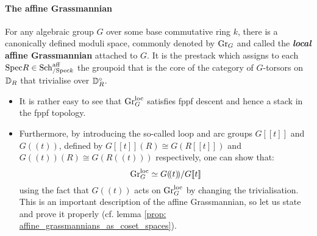                \paragraph{The affine Grassmannian}
                    \begin{definition} \label{def: local_affine_grassmannians}
                        For any algebraic group $G$ over some base commutative ring $k$, there is a canonically defined moduli space, commonly denoted by $\mathrm{Gr}_G$ and called the \textbf{\textit{local} affine Grassmannian} attached to $G$. It is the prestack which assigns to each $\mathrm{Spec} R \in \mathrm{Sch}_{/\mathrm{Spec} k}^{\mathrm{aff}}$ the groupoid that is the core of the category of $G$-torsors on $\mathbb{D}_R$ that trivialise over $\mathbb{D}_R^{\circ}$.  
                    \end{definition}
                    \begin{remark}
                        \noindent
                        \begin{itemize}
                            \item It is rather easy to see that $\mathrm{Gr}_G^{\mathrm{loc}}$ satisfies fppf descent and hence a stack in the fppf topology.
                            \item Furthermore, by introducing the so-called loop and arc groups $G[\![t]\!]$ and $G(\!(t)\!)$, defined by $G[\![t]\!](R) \cong G(R[\![t]\!])$ and $G(\!(t)\!)(R) \cong G(R(\!(t)\!))$ respectively, one can show that:
                                $$\mathrm{Gr}_G^{\mathrm{loc}} \simeq G(\!(t)\!)/G[\![t]\!]$$
                            using the fact that $G(\!(t)\!)$ acts on $\mathrm{Gr}_G^{\mathrm{loc}}$ by changing the trivialisation. This is an important description of the affine Grassmannian, so let us state and prove it properly (cf. lemma \ref{prop: affine_grassmannians_as_coset_spaces}).
                        \end{itemize}
                    \end{remark}
                    
